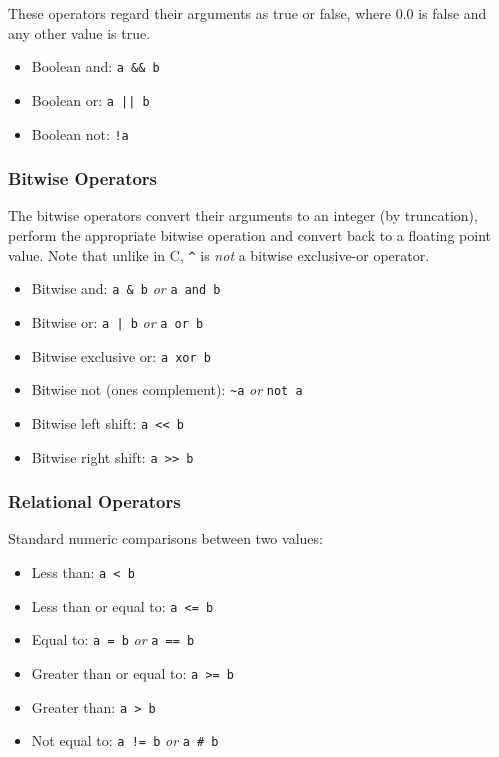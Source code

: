 These operators regard their arguments as true or false, where 0.0 is false and any other value is true.

\begin{itemize}
\item Boolean and: \verb|a && b|

\item Boolean or: \verb+a || b+

\item Boolean not: \verb|!a|

\end{itemize}

\subsubsection{Bitwise Operators}

The bitwise operators convert their arguments to an integer (by truncation), perform the appropriate bitwise operation and 
convert back to a floating point value. Note that unlike in C, \verb|^| is \emph{not} a bitwise exclusive-or operator.

\begin{itemize}
\item Bitwise and: \verb|a & b| \emph{or} \verb|a and b|

\item Bitwise or: \verb+a | b+ \emph{or} \verb|a or b|

\item Bitwise exclusive or: \verb|a xor b|

\item Bitwise not (ones complement): \verb|~a| \emph{or} \verb|not a|

\item Bitwise left shift: \verb|a << b|

\item Bitwise right shift: \verb|a >> b|

\end{itemize}

\subsubsection{Relational Operators}

Standard numeric comparisons between two values:

\begin{itemize}
\item Less than: \verb|a < b|

\item Less than or equal to: \verb|a <= b|

\item Equal to: \verb|a = b| \emph{or} \verb|a == b|

\item Greater than or equal to: \verb|a >= b|

\item Greater than: \verb|a > b|

\item Not equal to: \verb|a != b| \emph{or} \verb|a # b|

\end{itemize}

